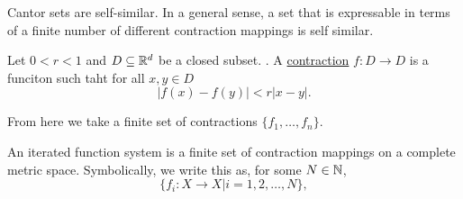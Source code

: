 





Cantor sets are self-similar.  In a general sense, a set that is expressable in terms of a finite number of different contraction mappings is self similar.  

\begin{definition}
    Let $0< r <1$ and $D \subseteq \mathbb{R}^d$ be a closed subset.  .  A \underline{contraction} $f: D \to D$ is a funciton such taht for all $x,y \in D$ $$\vert f(x) - f(y) \vert < r\vert x - y \vert.$$ 
\end{definition}

From here we take a finite set of contractions $\{f_1, \dots, f_n\}.$    

\begin{definition}
    An iterated function system is a finite set of contraction mappings on a complete metric space.  Symbolically, we write this as, for some $N \in \mathbb{N}$,
    $$\{f_i:X \to X \vert i = 1,2,\dots, N\}, $$
\end{definition}


